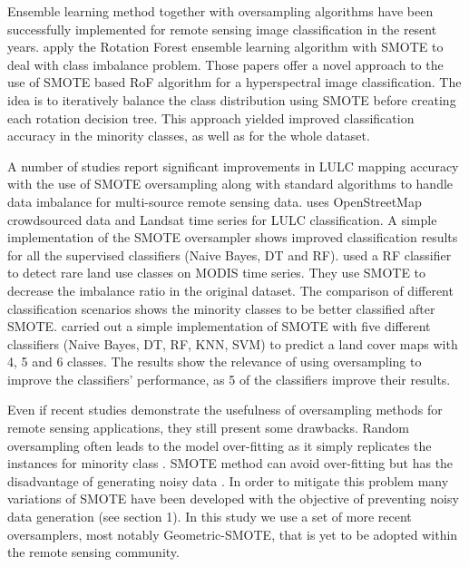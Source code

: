 \documentclass[parskip=full]{scrartcl}
\begin{document}
Ensemble learning method together with oversampling algorithms have been
successfully implemented for remote sensing image classification in the resent
years. \cite{Feng2018, Feng2019} apply the Rotation Forest ensemble learning
algorithm with SMOTE to deal with class imbalance problem. Those papers offer a
novel approach to the use of SMOTE based RoF algorithm for a hyperspectral image
classification. The idea is to iteratively balance the class distribution using
SMOTE before creating each rotation decision tree. This approach yielded
improved classification accuracy in the minority classes,  as well as for the
whole dataset.

A number of studies report significant improvements in LULC mapping accuracy
with the use of SMOTE oversampling along with standard algorithms to handle data
imbalance for multi-source remote sensing data. \cite{Johnson2016} uses
OpenStreetMap crowdsourced data and Landsat time series for LULC classification.
A simple implementation of the SMOTE oversampler shows improved classification
results for all the supervised classifiers (Naive Bayes, DT and RF).
\cite{Bogner2018} used a RF classifier to detect rare land use classes on MODIS
time series. They use SMOTE to decrease the imbalance ratio in the original
dataset. The comparison of different classification scenarios shows the minority
classes to be better classified after SMOTE. \cite{Panda2018} carried out a
simple implementation of SMOTE with five different classifiers (Naive Bayes, DT,
RF, KNN, SVM) to predict a land cover maps with 4, 5 and 6 classes. The results
show the relevance of using oversampling to improve the classifiers'
performance, as 5 of the classifiers improve their results.

Even if recent studies demonstrate the usefulness of oversampling methods for
remote sensing applications, they still present some drawbacks. Random
oversampling often leads to the model over-fitting as it simply replicates the
instances for minority class \cite{Feng2019}. SMOTE method can avoid
over-fitting but has the disadvantage of generating noisy data \cite{He2008}. In
order to mitigate this problem many variations of SMOTE have been developed with
the objective of preventing noisy data generation (see section 1). In this study
we use a set of more recent oversamplers, most notably Geometric-SMOTE, that is
yet to be adopted within the remote sensing community.
\end{document}
